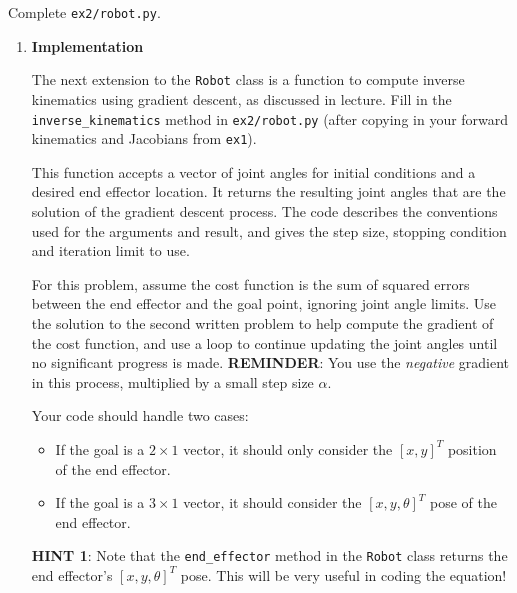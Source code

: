 \documentclass{16384_doc}
\begin{document}
\begin{questions}
\begin{enumerate}  [label=\alph*.]
    \end{enumerate}


    Complete \verb!ex2/robot.py!.

    \begin{enumerate} [label=\alph*.]

        \item \textbf{Implementation}

        The next extension to the \verb!Robot! class is a function to compute
        inverse kinematics using gradient descent, as discussed in lecture. Fill
        in the \verb!inverse_kinematics! method in \verb!ex2/robot.py! (after
        copying in your forward kinematics and Jacobians from \verb!ex1!).

        This function accepts a vector of joint angles for initial conditions and
        a desired end effector location. It returns the resulting joint angles
        that are the solution of the gradient descent process. The code describes
        the conventions used for the arguments and result, and gives the step
        size, stopping condition and iteration limit to use.

        For this problem, assume the cost function is the sum of squared errors
        between the end effector and the goal point, ignoring joint angle limits.
        Use the solution to the second written problem to help compute the
        gradient of the cost function, and use a loop to continue updating the
        joint angles until no significant progress is made. \textbf{REMINDER}:
        You use the \emph{negative} gradient in this process, multiplied by a
        small step size $\alpha$.

        Your code should handle two cases:
        \begin{itemize}
            \item If the goal is a $2 \times 1$ vector, it should only consider the
                $[x, y]^T$ position of the end effector.
            \item If the goal is a $3 \times 1$ vector, it should consider the
                $[x, y, \theta]^T$ pose of the end effector.
        \end{itemize}

        \textbf{HINT 1}: Note that the \verb!end_effector! method in the
        \verb!Robot! class returns the end effector's $[x, y, \theta]^T$ pose.
        This will be very useful in coding the equation!


\end{enumerate}
\end{questions}
\end{document}
